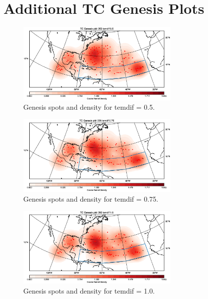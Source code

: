 


\chapter{Additional TC Genesis Plots}\label{sec:genesis-appendix}

\begin{figure}[ht]
	\centering
	\includegraphics[width=0.7\textwidth]{img/genesis_plot_temdif05.eps}
	\caption{Genesis spots and density for temdif = 0.5.}
\end{figure}
\begin{figure}[ht]
	\centering
	\includegraphics[width=0.7\textwidth]{img/genesis_plot_temdif075.eps}
	\caption{Genesis spots and density for temdif = 0.75.}
\end{figure}
\begin{figure}[ht]
	\centering
	\includegraphics[width=0.7\textwidth]{img/genesis_plot_temdif1.eps}
	\caption{Genesis spots and density for temdif = 1.0.}
\end{figure}
